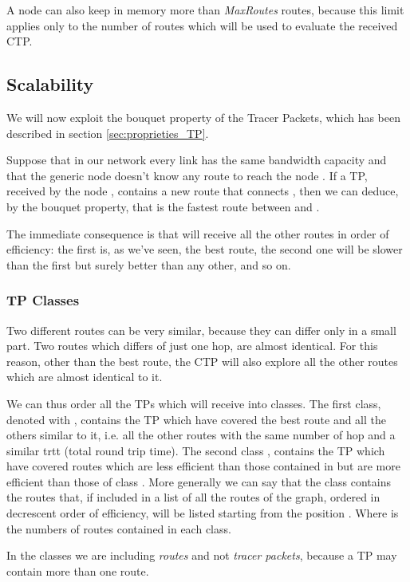 \documentclass[a4paper]{article}
\begin{document}
A node can also keep in memory more than \emph{MaxRoutes} routes, because this
limit applies only to the number of routes which will be used to evaluate the
received CTP.

\subsection{Scalability}
\label{sec:Scalability}
We will now exploit the bouquet property of the Tracer Packets, which has
been described in section \ref{sec:proprieties_TP}.

Suppose that in our network every link has the same bandwidth capacity and
that the generic node  doesn't know any route to reach the
node .
If a TP, received by the node , contains a new route  that
connects , then we can deduce, by the bouquet property, that
 is the fastest route between  and .

The immediate consequence is that  will receive all the other  routes in order of efficiency: the first is, as we've seen,
the best route, the second one will be slower than the first but surely
better than any other, and so on.


\subsubsection{TP Classes}
\label{sec:tp_classes}
Two different routes can be very similar, because they can differ only in a
small part. Two routes which differs of just one hop, are almost identical.
For this reason, other than the best  route, the CTP will
also explore all the other routes which are almost identical to it.

We can thus order all the TPs which  will receive into classes. The first
class, denoted with , contains the TP which have covered the best
route and all the others similar to it, i.e. all the other routes with the same
number of hop and a similar trtt (total round trip time).
The second class , contains the TP which have covered routes which are
less efficient than those contained in  but are more efficient than those
of class .
More generally we can say that the  class contains the routes that,
if included in a list of all the routes of the graph, ordered in decrescent
order of efficiency, will be listed starting from the position . Where
 is the numbers of routes contained in each class.

In the classes we are including \emph{routes} and not \emph{tracer packets},
because a TP may contain more than one route.
\end{document}
